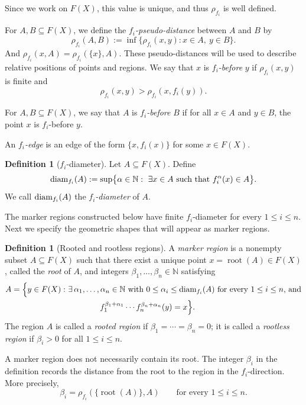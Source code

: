 \documentclass[11pt, reqno, a4paper]{amsart}
\theoremstyle{definition}
\newtheorem{definition}[theorem]{Definition}
\theoremstyle{plain}
\newcommand{\diam}{\text{\rm diam}}
\begin{document}
Since we work on $F(X)$, this value is unique, and thus $\rho_{f_i}$ is well defined.

For $A,B\subseteq F(X)$, we define the \emph{$f_i$-pseudo-distance} between $A$ and $B$ by
$$
\rho_{f_i}(A,B):=\inf\{\rho_{f_i}(x,y):x\in A,\ y\in B\}.
$$
And $\rho_{f_i}(x,A)=\rho_{f_i}(\{x\},A)$.
These pseudo-distances will be used to describe relative positions of points and regions. 
We say that $x$ is \emph{$f_i$-before} $y$ if $\rho_{f_i}(x,y)$ is finite and 
$$
\rho_{f_i}(x,y)>\rho_{f_i}(x,f_i(y)).
$$ 

For $A,B\subseteq F(X)$, we say that $A$ is \emph{$f_i$-before} $B$ if for all $x\in A$ and $y\in B$, the point $x$ is $f_i$-before $y$.
 
 An \emph{$f_i$-edge} is an edge of the form $\{x,f_i(x)\}$ for some $x\in F(X)$.
 
\begin{definition}[$f_i$-diameter]
Let $A\subseteq F(X)$. Define
$$
\diam_{f_i}(A):=\sup\bigl\{\alpha\in\mathbb N:\ \exists x\in A \text{ such that } f_i^{\alpha}(x)\in A\bigr\}.
$$
We call $\diam_{f_i}(A)$ the \emph{$f_i$-diameter} of $A$. 
\end{definition}

The marker regions constructed below have finite $f_i$-diameter
for every $1\le i\le n$. Next we specify the geometric shapes that will appear as marker regions.

\begin{definition}[Rooted and rootless regions]
A \emph{marker region} is a nonempty subset $A\subseteq F(X)$ such that
there exist a unique point
$x=\operatorname{root}(A)\in F(X)$,
called the \emph{root} of $A$, and integers
$\beta_1,\ldots, \beta_n\in\mathbb{N}$
satisfying
$$
\begin{aligned}
A=\Bigl\{y\in F(X):\ &
\exists\, \alpha_1,\ldots, \alpha_n\in\mathbb N
\text{ with }0\le \alpha_i\le \diam_{f_i}(A)\text{ for every $1\le i\le n$, and}\\
&
\quad \quad \quad \quad f_1^{\beta_1+\alpha_1}\cdots f_n^{\beta_n+\alpha_n}(y)=x
\Bigr\}.
\end{aligned}
$$
The region $A$ is called a \emph{rooted region} if $\beta_1=\cdots=\beta_n=0$; it is called a \emph{rootless region} if $\beta_i>0$ for all $1\leq i\leq n$.
\end{definition}

A marker region does not necessarily contain its root. The integer $\beta_i$ in the definition records the distance from the root to
the region in the $f_i$-direction. More precisely,
$$
\beta_i=\rho_{f_i}(\{\operatorname{root}(A)\},A)
\qquad\text{for every }1\le i\le n.
$$
\end{document}
